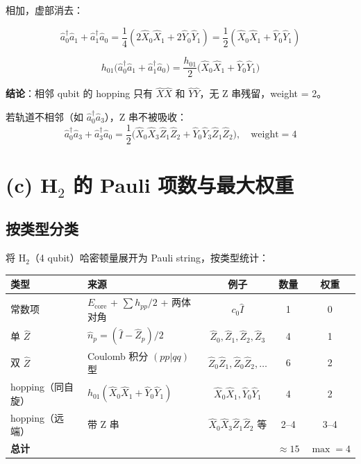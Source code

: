 \documentclass[11pt,a4paper]{article}
\begin{document}
相加，虚部消去：

\begin{equation}
  \hat{a}_0^\dagger \hat{a}_1 + \hat{a}_1^\dagger \hat{a}_0
  = \frac{1}{4}\left(2\hat{X}_0\hat{X}_1 + 2\hat{Y}_0\hat{Y}_1\right)
  = \frac{1}{2}\left(\hat{X}_0\hat{X}_1 + \hat{Y}_0\hat{Y}_1\right)
\end{equation}

\begin{equation}
  \boxed{\;h_{01}\big(\hat{a}_0^\dagger \hat{a}_1 + \hat{a}_1^\dagger \hat{a}_0\big)
  = \frac{h_{01}}{2}\big(\hat{X}_0\hat{X}_1 + \hat{Y}_0\hat{Y}_1\big)\;}
\end{equation}

\textbf{结论}：相邻 qubit 的 hopping 只有 $\hat{X}\hat{X}$ 和 $\hat{Y}\hat{Y}$，无 Z 串残留，weight = 2。

若轨道不相邻（如 $\hat{a}_0^\dagger\hat{a}_3$），Z 串不被吸收：
\begin{equation}
  \hat{a}_0^\dagger\hat{a}_3 + \hat{a}_3^\dagger\hat{a}_0
  = \frac{1}{2}\big(\hat{X}_0\hat{X}_3\hat{Z}_1\hat{Z}_2 + \hat{Y}_0\hat{Y}_3\hat{Z}_1\hat{Z}_2\big),
  \quad\text{weight} = 4
\end{equation}

\section{(c) H$_2$ 的 Pauli 项数与最大权重}

\subsection{按类型分类}

将 H$_2$（4 qubit）哈密顿量展开为 Pauli string，按类型统计：

\begin{center}
\begin{tabular}{llccc}
  \toprule
  类型 & 来源 & 例子 & 数量 & 权重 \\
  \midrule
  常数项 & $E_{\text{core}}$ + $\sum h_{pp}/2$ + 两体对角 & $c_0\hat{I}$ & 1 & 0 \\
  单 $\hat{Z}$ & $\hat{n}_p = (\hat{I}-\hat{Z}_p)/2$ & $\hat{Z}_0,\hat{Z}_1,\hat{Z}_2,\hat{Z}_3$ & 4 & 1 \\
  双 $\hat{Z}$ & Coulomb 积分 $(pp|qq)$ 型 & $\hat{Z}_0\hat{Z}_1,\hat{Z}_0\hat{Z}_2,\ldots$ & 6 & 2 \\
  hopping（同自旋） & $h_{01}(\hat{X}_0\hat{X}_1+\hat{Y}_0\hat{Y}_1)$ & $\hat{X}_0\hat{X}_1,\hat{Y}_0\hat{Y}_1$ & 4 & 2 \\
  hopping（远端） & 带 Z 串 & $\hat{X}_0\hat{X}_3\hat{Z}_1\hat{Z}_2$ 等 & 2--4 & 3--4 \\
  \midrule
  \multicolumn{3}{l}{\textbf{总计}} & $\approx 15$ & $\max = 4$ \\
  \bottomrule
\end{tabular}
\end{center}
\end{document}
